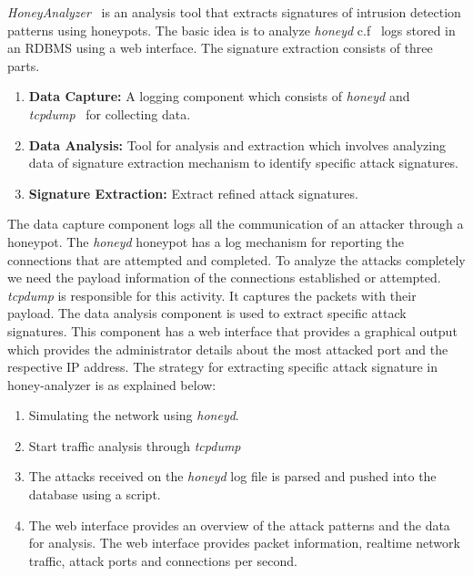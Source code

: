 \documentclass[article,msc=informatik,type=msc,colorback,accentcolor=tud9c]{tudthesis}
\begin{document}
	
	\vspace{3mm}
	\textit{HoneyAnalyzer}~\cite{thakar2005honeyanalyzer} is an analysis tool that extracts signatures of intrusion detection patterns using honeypots. The basic idea is to analyze \textit{honeyd} c.f~\cite{provos2003honeyd} logs stored in an \ac{RDBMS} using a web interface. The signature extraction consists of three parts.
		
		\begin{enumerate}
		
		\item\textbf{Data Capture:} A logging component which consists of \textit{honeyd} and \textit{tcpdump}~\cite{jacobsen2005tcpdump} for collecting data.
		
		\item\textbf{Data Analysis:} Tool for analysis and extraction which involves analyzing data of signature extraction mechanism to identify specific attack signatures.
		
		\item\textbf{Signature Extraction:} Extract refined attack signatures.
		
		\end{enumerate}
		
		The data capture component logs all the communication of an attacker through a honeypot. The \textit{honeyd} honeypot has a log mechanism for reporting the connections that are attempted and completed. To analyze the attacks completely we need the payload information of the connections established or attempted. \textit{tcpdump} is responsible for this activity. It captures the packets with their payload. The data analysis component is used to extract specific attack signatures. This component has a web interface that provides a graphical output which provides the administrator details about the most attacked port and the respective IP address. The strategy for extracting specific attack signature in honey-analyzer is as explained below:
		
		\begin{enumerate}
		
		\item Simulating the network using \textit{honeyd}.
		
		\item Start traffic analysis through \textit{tcpdump}
		
		\item The attacks received on the \textit{honeyd} log file is parsed and pushed into the database using a script.
		
		\item The web interface provides an overview of the attack patterns and the data for analysis. The web interface provides packet information, realtime network traffic, attack ports and connections per second. 
			
		\end{enumerate}
		
\end{document}
